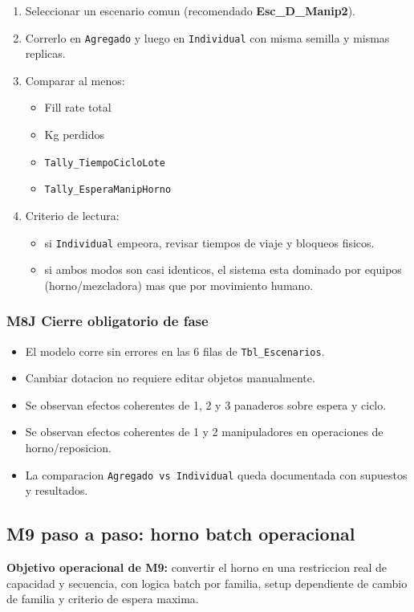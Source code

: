 \documentclass[11pt]{article}
\newcommand{\simio}[1]{\texttt{#1}}
\newcommand{\tabla}[1]{\texttt{#1}}
\begin{document}
\begin{enumerate}
  \item Seleccionar un escenario comun (recomendado \textbf{Esc\_D\_Manip2}).
  \item Correrlo en \simio{Agregado} y luego en \simio{Individual} con misma semilla y mismas replicas.
  \item Comparar al menos:
  \begin{itemize}
    \item Fill rate total
    \item Kg perdidos
    \item \simio{Tally\_TiempoCicloLote}
    \item \simio{Tally\_EsperaManipHorno}
  \end{itemize}
  \item Criterio de lectura:
  \begin{itemize}
    \item si \simio{Individual} empeora, revisar tiempos de viaje y bloqueos fisicos.
    \item si ambos modos son casi identicos, el sistema esta dominado por equipos (horno/mezcladora) mas que por movimiento humano.
  \end{itemize}
\end{enumerate}

\subsubsection{M8J Cierre obligatorio de fase}
\begin{itemize}
  \item El modelo corre sin errores en las 6 filas de \tabla{Tbl\_Escenarios}.
  \item Cambiar dotacion no requiere editar objetos manualmente.
  \item Se observan efectos coherentes de 1, 2 y 3 panaderos sobre espera y ciclo.
  \item Se observan efectos coherentes de 1 y 2 manipuladores en operaciones de horno/reposicion.
  \item La comparacion \simio{Agregado vs Individual} queda documentada con supuestos y resultados.
\end{itemize}

\subsection{M9 paso a paso: horno batch operacional}
\textbf{Objetivo operacional de M9:} convertir el horno en una restriccion real de capacidad y secuencia, con logica batch por familia, setup dependiente de cambio de familia y criterio de espera maxima.
\end{document}
